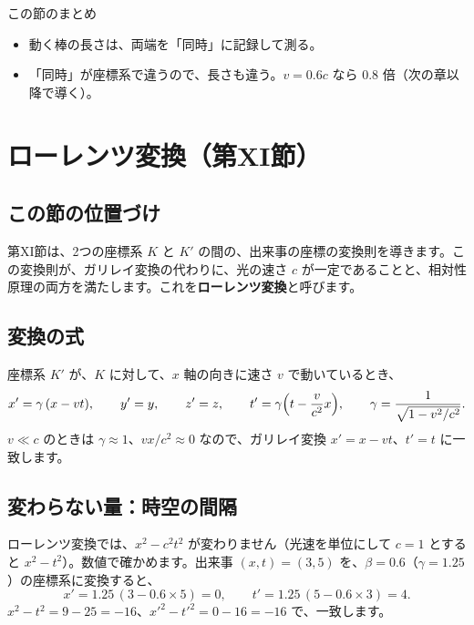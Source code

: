 \documentclass[a4paper,11pt,openany]{ltjsbook}
\begin{document}
\begin{pointbox}{この節のまとめ}
\begin{itemize}[leftmargin=*]
\item 動く棒の長さは、両端を「同時」に記録して測る。
\item 「同時」が座標系で違うので、長さも違う。$v=0.6c$ なら $0.8$ 倍（次の章以降で導く）。
\end{itemize}
\end{pointbox}

\chapter{ローレンツ変換（第XI節）}

\section{この節の位置づけ}

第XI節は、2つの座標系 $K$ と $K'$ の間の、出来事の座標の変換則を導きます。この変換則が、ガリレイ変換の代わりに、光の速さ $c$ が一定であることと、相対性原理の両方を満たします。これを\textbf{ローレンツ変換}と呼びます。

\section{変換の式}

座標系 $K'$ が、$K$ に対して、$x$ 軸の向きに速さ $v$ で動いているとき、
\[
x'=\gamma\,(x-vt),\qquad y'=y,\qquad z'=z,\qquad t'=\gamma\Bigl(t-\frac{v}{c^2}x\Bigr),\qquad\gamma=\frac1{\sqrt{1-v^2/c^2}} .
\]
$v\ll c$ のときは $\gamma\approx1$、$vx/c^2\approx0$ なので、ガリレイ変換 $x'=x-vt$、$t'=t$ に一致します。

\section{変わらない量：時空の間隔}

ローレンツ変換では、$x^2-c^2t^2$ が変わりません（光速を単位にして $c=1$ とすると $x^2-t^2$）。数値で確かめます。出来事 $(x,t)=(3,5)$ を、$\beta=0.6$（$\gamma=1.25$）の座標系に変換すると、
\[
x'=1.25\,(3-0.6\times5)=0,\qquad t'=1.25\,(5-0.6\times3)=4 .
\]
$x^2-t^2=9-25=-16$、$x'^2-t'^2=0-16=-16$ で、一致します。
\end{document}
